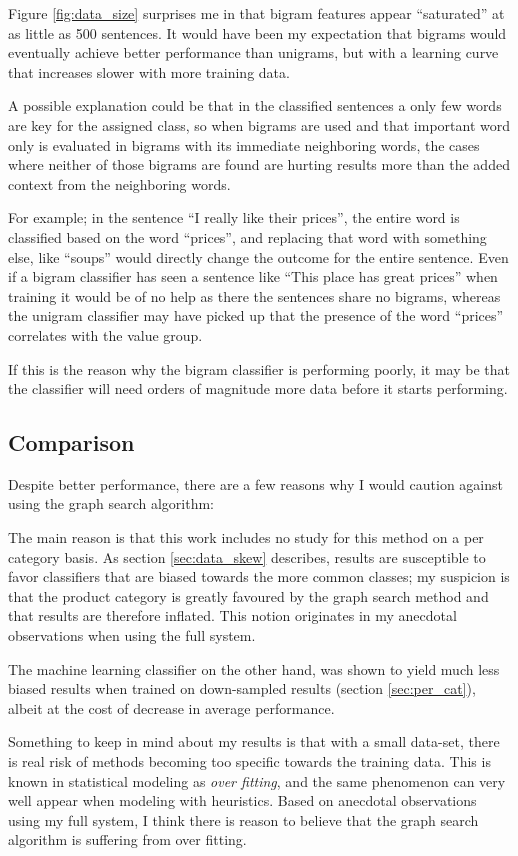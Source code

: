\documentclass[a4paper,11pt]{kth-mag}
\begin{document}
Figure \ref{fig:data_size} surprises me in that bigram features appear ``saturated'' at as little as 500 sentences.
It would have been my expectation that bigrams would eventually achieve better performance than unigrams, but
with a learning curve that increases slower with more training data.

A possible explanation could be that in the classified sentences a only few words are key for the assigned class,
so when bigrams are used and that important word only is evaluated in bigrams with its immediate neighboring words,
the cases where neither of those bigrams are found are hurting results more than the added context from the neighboring words.

For example; in the sentence ``I really like their prices'', the entire word is classified based on the word ``prices'', and replacing that word with something else, like ``soups'' would directly change the outcome for the entire sentence. Even if a bigram classifier has seen a sentence like ``This place has great prices'' when training it would be of no help as there the sentences share no bigrams, whereas the unigram classifier may have picked up that the presence of the word ``prices'' correlates with the value group.

If this is the reason why the bigram classifier is performing poorly, it may be that the classifier will need orders
of magnitude more data before it starts performing.


\subsection{Comparison}
Despite better performance, there are a few reasons why I would caution against using the graph search algorithm:

The main reason is that this work includes no study for this method on a per category basis.
As section \ref{sec:data_skew} describes, results are
susceptible to favor classifiers that are biased towards the more common classes; my suspicion is that
the product category is greatly favoured by the graph search method and that results are therefore inflated.
This notion originates in my anecdotal observations when using the full system.

The machine learning classifier on the other hand, was shown to yield much less biased results
when trained on down-sampled results (section \ref{sec:per_cat}), albeit at the cost of
decrease in average performance.

Something to keep in mind about my results is that with a small data-set,
there is real risk of methods becoming too specific towards the training data.
This is known in statistical modeling as \emph{over fitting},
and the same phenomenon can very well appear when modeling with heuristics.
Based on anecdotal observations using my full system, I think there is reason to believe that
the graph search algorithm is suffering from over fitting.
\end{document}
